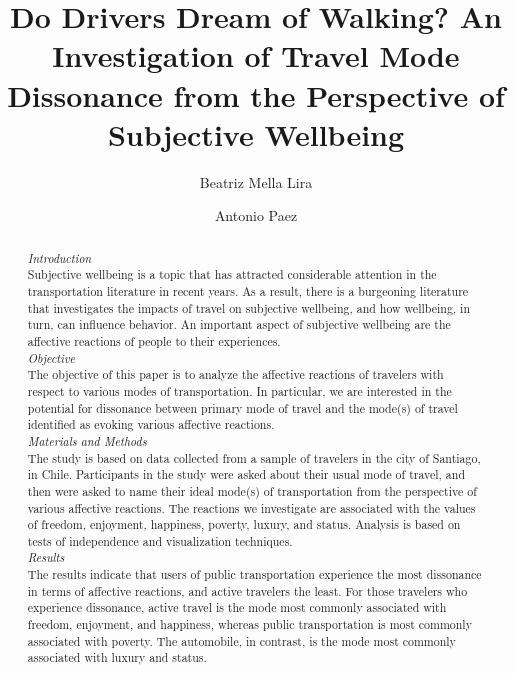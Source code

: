 \documentclass[]{elsarticle} %
\begin{document}
\begin{frontmatter}

  \title{Do Drivers Dream of Walking? An Investigation of Travel Mode Dissonance
from the Perspective of Subjective Wellbeing}
    \author[PUC]{Beatriz Mella Lira}
    \author[McMaster University]{Antonio Paez}
      \address[PUC]{BRT+ Centre of Excellence, Departamento Ingeniería de Transporte y
Logística, Escuela de Ingeniería, Pontificia Universidad Católica de
Chile}
    \address[McMaster University]{School of Earth, Environment, and Society, McMaster University, 1280
Main St W, Hamilton, Ontario, L8S 1S4 Canada}
    
  \begin{abstract}
  \emph{Introduction}\\
  Subjective wellbeing is a topic that has attracted considerable
  attention in the transportation literature in recent years. As a result,
  there is a burgeoning literature that investigates the impacts of travel
  on subjective wellbeing, and how wellbeing, in turn, can influence
  behavior. An important aspect of subjective wellbeing are the affective
  reactions of people to their experiences.\\
  \emph{Objective}\\
  The objective of this paper is to analyze the affective reactions of
  travelers with respect to various modes of transportation. In
  particular, we are interested in the potential for dissonance between
  primary mode of travel and the mode(s) of travel identified as evoking
  various affective reactions.\\
  \emph{Materials and Methods}\\
  The study is based on data collected from a sample of travelers in the
  city of Santiago, in Chile. Participants in the study were asked about
  their usual mode of travel, and then were asked to name their ideal
  mode(s) of transportation from the perspective of various affective
  reactions. The reactions we investigate are associated with the values
  of freedom, enjoyment, happiness, poverty, luxury, and status. Analysis
  is based on tests of independence and visualization techniques.\\
  \emph{Results}\\
  The results indicate that users of public transportation experience the
  most dissonance in terms of affective reactions, and active travelers
  the least. For those travelers who experience dissonance, active travel
  is the mode most commonly associated with freedom, enjoyment, and
  happiness, whereas public transportation is most commonly associated
  with poverty. The automobile, in contrast, is the mode most commonly
  associated with luxury and status.
  \end{abstract}
  
 \end{frontmatter}
\end{document}
